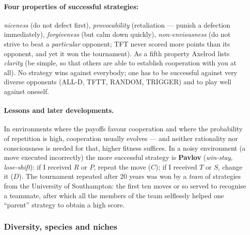 \documentclass[11pt,a4paper]{article}
\theoremstyle{definition}
\providecommand{\uv}[1]{``#1''}
\begin{document}
\paragraph{Four properties of successful strategies:}
\emph{niceness} (do not defect first),
\emph{provocability} (retaliation --- punish a defection immediately),
\emph{forgiveness} (but calm down quickly),
\emph{non-enviousness} (do not strive to beat a \emph{particular} opponent; TFT
never scored more points than its opponent, and yet it won the tournament).
As a fifth property Axelrod lists \emph{clarity} (be simple, so that others are
able to establish cooperation with you at all).
No strategy wins against everybody; one has to be successful against very
diverse opponents (ALL-D, TFTT, RANDOM, TRIGGER) and to play well against
oneself.

\paragraph{Lessons and later developments.} In environments where the payoffs
favour cooperation and where the probability of repetition is high, cooperation
usually evolves --- and neither rationality nor consciousness is needed for
that, higher fitness suffices. In a noisy environment (a move executed
incorrectly) the more successful strategy is \textbf{Pavlov}
(\emph{win-stay, lose-shift}): if I received $R$ or $P$, repeat the move ($C$);
if I received $T$ or $S$, change it ($D$).
The tournament repeated after 20 years was won by a \emph{team} of strategies
from the University of Southampton: the first ten moves or so served to
recognise a teammate, after which all the members of the team selflessly helped
one \uv{parent} strategy to obtain a high score.

\subsubsection{Diversity, species and niches}
\end{document}
